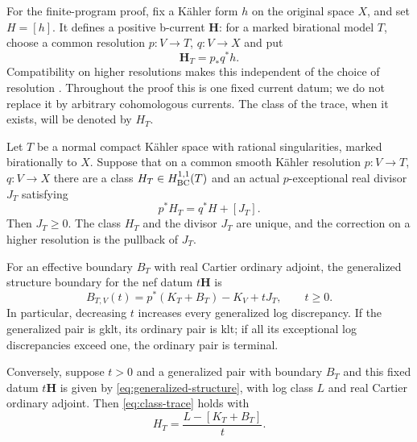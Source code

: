 For the finite-program proof, fix a K\"ahler form $h$ on the original
space $X$, and set $H=[h]$.  It defines a positive b-current
$\mathbf H$: for a marked birational model $T$, choose a common
resolution $p:V\to T$, $q:V\to X$ and put
\begin{equation}\label{eq:actual-H-trace}
 \mathbf H_T=p_*q^*h.
\end{equation}
Compatibility on higher resolutions makes this independent of the
choice of resolution \cite[Claim~2.5]{DHY2023}.  Throughout the proof
this is one fixed current datum; we do not replace it by arbitrary
cohomologous currents.  The class of the trace, when it exists, will
be denoted by $H_T$.

\begin{lemma}\label{lem:class-trace}
Let $T$ be a normal compact K\"ahler space with rational singularities,
marked birationally to $X$.  Suppose that on a common smooth K\"ahler
resolution $p:V\to T$, $q:V\to X$ there are a class $H_T\in H^{1,1}_{\mathrm{BC}}(T)$
and an actual $p$-exceptional real divisor $J_T$ satisfying
\begin{equation}\label{eq:class-trace}
 p^*H_T=q^*H+[J_T].
\end{equation}
Then $J_T\geq0$.  The class $H_T$ and the divisor $J_T$ are unique,
and the correction on a higher resolution is the pullback of $J_T$.

For an effective boundary $B_T$ with real Cartier ordinary adjoint,
the generalized structure boundary for the nef datum $t\mathbf H$ is
\begin{equation}\label{eq:trace-boundary}
 B_{T,V}(t)=p^*(K_T+B_T)-K_V+tJ_T,\qquad t\geq0.
\end{equation}
In particular, decreasing $t$ increases every generalized log
discrepancy.  If the generalized pair is gklt, its ordinary pair is
klt; if all its exceptional log discrepancies exceed one, the
ordinary pair is terminal.

Conversely, suppose $t>0$ and a generalized pair with boundary $B_T$
and this fixed datum $t\mathbf H$ is given by
\eqref{eq:generalized-structure}, with log class $L$ and real Cartier
ordinary adjoint.  Then \eqref{eq:class-trace} holds with
\[
 H_T=\frac{L-[K_T+B_T]}{t}.
\]
\end{lemma}

